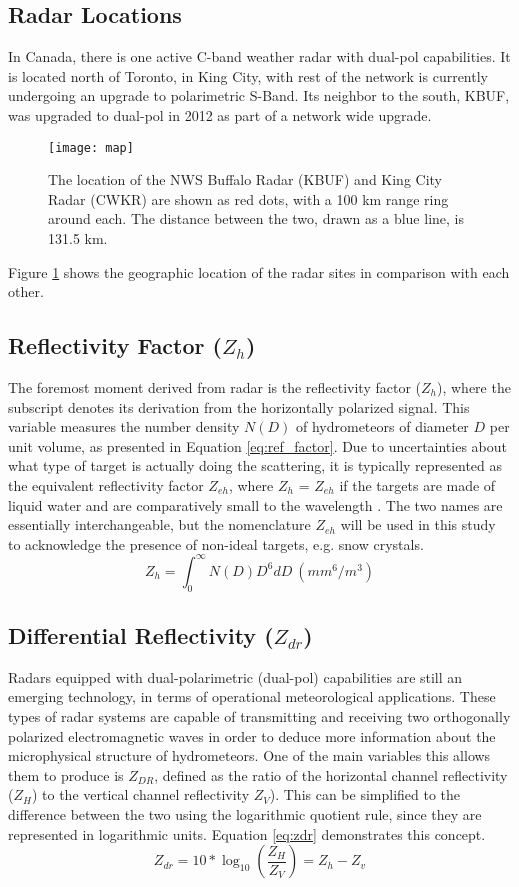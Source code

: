 \subsection{Radar Locations}
In Canada, there is one active C-band weather radar with dual-pol capabilities. It is located north of Toronto, in King City, with rest of the network is
currently undergoing an upgrade to polarimetric S-Band. Its neighbor to the south, KBUF, was upgraded to dual-pol in 2012 as part of a network wide upgrade. 
\begin{figure}[h]
\texttt{[image: map]}
\caption{The location of the NWS Buffalo Radar (KBUF) and King City Radar (CWKR) are shown as red dots, with a 100 km range ring around each. The distance
between the two, drawn as a blue line, is 131.5 km.} 
\label{map}
\end{figure}
Figure \ref{map} shows the geographic location of the radar sites in comparison with each other.
\subsection{Reflectivity Factor ($Z_{h}$)}
The foremost moment derived from radar is the reflectivity factor ($Z_{h}$), where the
subscript denotes its derivation from the horizontally polarized signal. This variable
measures the number density $N(D)$ of hydrometeors of diameter $D$ per unit volume, as
presented in Equation \ref{eq:ref_factor}. Due to uncertainties about what type of
target is actually doing the scattering, it is typically represented as the equivalent
reflectivity factor $Z_{eh}$, where $Z_{h}$ = $Z_{eh}$ if the targets are made of liquid 
water and are comparatively small to the wavelength \citep{Fabry2015}. The two names are 
essentially interchangeable, but the nomenclature $Z_{eh}$ will be used in this study to 
acknowledge the presence of non-ideal targets, e.g. snow crystals.
\begin{equation}\label{eq:ref_factor}
Z_{h} = \int_0^{\infty} N(D)D^6dD \ (mm^6/m^3)
\end{equation}
\subsection{Differential Reflectivity ($Z_{dr}$)}
Radars equipped with dual-polarimetric (dual-pol) capabilities are still an emerging technology, in terms of operational meteorological applications. These
types of radar systems are capable of transmitting and receiving two orthogonally polarized electromagnetic waves in order to deduce more information about
the microphysical structure of hydrometeors. One of the main variables this allows them to produce is $Z_{DR}$, defined as the ratio of the horizontal
channel reflectivity ($Z_H$) to the vertical channel reflectivity $Z_{V}$). This can be simplified to the difference between the two using the logarithmic
quotient rule, since they are represented in logarithmic units. Equation \ref{eq:zdr} demonstrates this concept.
\begin{equation}\label{eq:zdr}
Z_{dr} = 10 * \log_{10}(\frac{Z_H}{Z_V}) = Z_h - Z_v
\end{equation}
